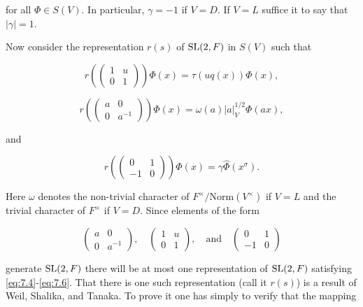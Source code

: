for all $\Phi \in S(V)$. In particular, $\gamma = -1$ if $V = D$. If $V = L$ suffice it to say that $|\gamma| = 1$.

Now consider the representation $r(s)$ of $\operatorname{SL}(2,F)$ in $S(V)$ such that

\begin{equation}\label{eq:7.4}
r\left(\begin{pmatrix} 1 & u \\ 0 & 1 \end{pmatrix}\right)\Phi(x) = \tau(uq(x))\Phi(x),\tag{7.4}
\end{equation}

\begin{equation}\label{eq:7.5}
r\left(\begin{pmatrix} a & 0 \\ 0 & a^{-1} \end{pmatrix}\right)\Phi(x) = \omega(a)|a|_V^{1/2}\Phi(ax),\tag{7.5}
\end{equation}

and

\begin{equation}\label{eq:7.6}
r\left(\begin{pmatrix} 0 & 1 \\ -1 & 0 \end{pmatrix}\right)\Phi(x) = \gamma\hat{\Phi}(x^{\sigma}).\tag{7.6}
\end{equation}

Here $\omega$ denotes the non-trivial character of $F^{\times}/\mathrm{Norm}(V^{\times})$ if $V = L$ and the trivial character of $F^{\times}$ if $V = D$. Since elements of the form

\begin{equation}\label{eq:7.7}
\begin{pmatrix} a & 0 \\ 0 & a^{-1} \end{pmatrix}, \quad \begin{pmatrix} 1 & u \\ 0 & 1 \end{pmatrix}, \quad \text{and} \quad \begin{pmatrix} 0 & 1 \\ -1 & 0 \end{pmatrix}\tag{7.7}
\end{equation}

generate $\operatorname{SL}(2,F)$ there will be at most one representation of $\operatorname{SL}(2,F)$ satisfying \eqref{eq:7.4}-\eqref{eq:7.6}. That there is one such representation (call it $r(s)$) is a result of Weil, Shalika, and Tanaka. To prove it one has simply to verify that the mapping

